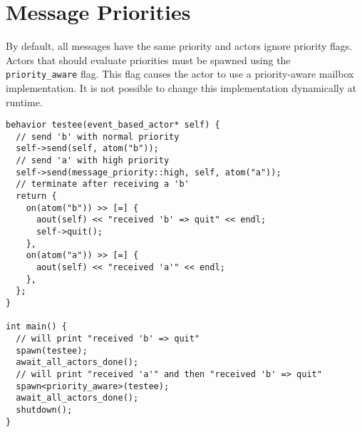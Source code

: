 \section{Message Priorities}

By default, all messages have the same priority and actors ignore priority flags.
Actors that should evaluate priorities must be spawned using the \lstinline^priority_aware^ flag.
This flag causes the actor to use a priority-aware mailbox implementation.
It is not possible to change this implementation dynamically at runtime.

\begin{lstlisting}
behavior testee(event_based_actor* self) {
  // send 'b' with normal priority
  self->send(self, atom("b"));
  // send 'a' with high priority
  self->send(message_priority::high, self, atom("a"));
  // terminate after receiving a 'b'
  return {
    on(atom("b")) >> [=] {
      aout(self) << "received 'b' => quit" << endl;
      self->quit();
    },
    on(atom("a")) >> [=] {
      aout(self) << "received 'a'" << endl;
    },
  };
}

int main() {
  // will print "received 'b' => quit"
  spawn(testee);
  await_all_actors_done();
  // will print "received 'a'" and then "received 'b' => quit"
  spawn<priority_aware>(testee);
  await_all_actors_done();
  shutdown();
}
\end{lstlisting}
